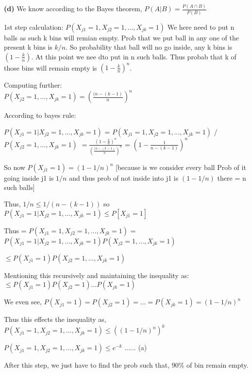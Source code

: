 \documentclass[11pt]{article}
\renewcommand\part[1]{\vspace{.10in}\textbf{(#1)}}
\begin{document}
\part{d}
We know according to the Bayes theorem, $P(A|B) = \frac{P(A \cap B)}{P(B)}$

1st step calculation:
$P(X_{j1} = 1, X_{j2} = 1, \dots , X_{jk} = 1)$ 
We here need to put n balls as such k bins will remian empty. Prob that we put ball in any one of the present k bins is $k/n$. So probability that ball will no go inside, any k bins is $(1 - \frac{k}{n})$. At this point we nee dto put in n such balls. Thus probab that k of those bins will remain empty is $(1 - \frac{k}{n})^{n}$.

Computing further:\\
$P(X_{j2} = 1, \dots , X_{jk} = 1) = (\frac{(n - (k-1)}{n})^{n}$

According to bayes rule:

$P(X_{j1} = 1| X_{j2} = 1, \dots , X_{jk} = 1)$ = $P(X_{j1} = 1, X_{j2} = 1, \dots , X_{jk} = 1)$ / $P(X_{j2} = 1, \dots , X_{jk} = 1)$
$ = \frac{(1 - \frac{k}{n})^{n}}{(\frac{(n - (k-1)}{n})^{n}}$ = $(1 - \frac{1}{n - (k-1)})^{n}$

So now $P(X_{j1} = 1) = (1 - 1/n)^{n}$ [because is we consider every ball Prob of it going inside j1 is $1/n$ and thus prob of not inside into j1 is $(1 - 1/n)$ there = n such balls]

Thus, $1/n \leq 1/(n-(k-1))$ so $P(X_{j1} = 1| X_{j2} = 1, \dots , X_{jk} = 1) \leq P[X_{j1} = 1]$

Thus = $P(X_{j1} = 1, X_{j2} = 1, \dots , X_{jk} = 1)$ = $P(X_{j1} = 1 | X_{j2} = 1, \dots , X_{jk} = 1)  P( X_{j2} = 1, \dots , X_{jk} = 1)$

$ \leq P(X_{j1} = 1)  P( X_{j2} = 1, \dots , X_{jk} = 1)$

Mentioning this recursively and maintaining the inequality as:\\
$ \leq P(X_{j1} = 1) P(X_{j2} = 1) \dots P(X_{jk} = 1) $

We even see, $P(X_{j1} = 1) = P(X_{j2} = 1) = \dots = P(X_{jk} = 1) = (1 - 1/n)^{n}$

Thus this effects the inequality as,
$P(X_{j1} = 1, X_{j2} = 1, \dots , X_{jk} = 1) \leq ((1- 1/n)^{n})^{k}$

$P(X_{j1} = 1, X_{j2} = 1, \dots , X_{jk} = 1) \leq e^{-k}$ ...... (a)

After this step, we just have to find the prob such that, $90\%$ of bin remain empty.\\
\end{document}
